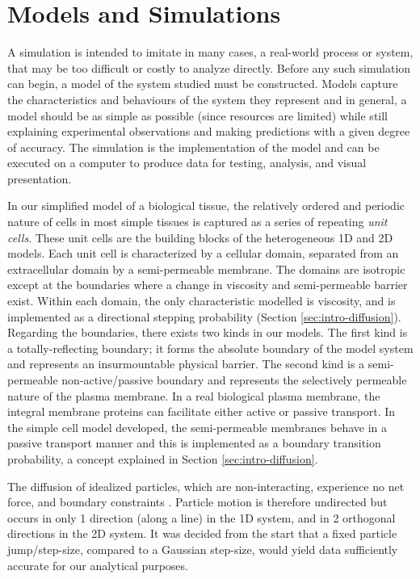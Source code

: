\chapter{Models and Simulations}

A simulation is intended to imitate in many cases, a real-world process or system, that may be too difficult or costly to analyze directly. Before any such simulation can begin, a model of the system studied must be constructed. Models capture the characteristics and behaviours of the system they represent and in general, a model should be as simple as possible (since resources are limited) while still explaining experimental observations and making predictions with a given degree of accuracy. The simulation is the implementation of the model and can be executed on a computer to produce data for testing, analysis, and visual presentation.

In our simplified model of a biological tissue, the relatively ordered and periodic nature of cells in most simple tissues is captured as a series of repeating \textit{unit cells}. These unit cells are the building blocks of the heterogeneous 1D and 2D models. Each unit cell is characterized by a cellular domain, separated from an extracellular domain by a semi-permeable membrane. The domains are isotropic except at the boundaries where a change in viscosity and semi-permeable barrier exist. Within each domain, the only characteristic modelled is viscosity, and is implemented as a directional stepping probability (Section \ref{sec:intro-diffusion}). Regarding the boundaries, there exists two kinds in our models. The first kind is a totally-reflecting boundary; it forms the absolute boundary of the model system and represents an insurmountable physical barrier. The second kind is a semi-permeable non-active/passive boundary and represents the selectively permeable nature of the plasma membrane. In a real biological plasma membrane, the integral membrane proteins can facilitate either active or passive transport. In the simple cell model developed, the semi-permeable membranes behave in a passive transport manner and this is implemented as a boundary transition probability, a concept explained in Section \ref{sec:intro-diffusion}.

The diffusion of idealized particles, which are non-interacting, experience no net force, and boundary constraints . Particle motion is therefore undirected but occurs in only 1 direction (along a line) in the 1D system, and in 2 orthogonal directions in the 2D system. It was decided from the start that a fixed particle jump/step-size, compared to a Gaussian step-size, would yield data sufficiently accurate for our analytical purposes.

